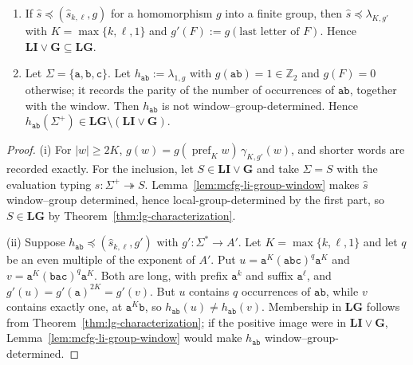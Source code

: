 \begin{proposition}
\label{prop:li-g-strict}
\begin{enumerate}[label=\textup{(\roman*)},leftmargin=*]
\item If $\widehat{s}\preceq(\widehat{s}_{k,\ell},g)$ for a homomorphism $g$ into a
finite group, then $\widehat{s}\preceq\lambda_{K,g'}$ with $K=\max\{k,\ell,1\}$
and $g'(F):=g(\text{last letter of }F)$.  Hence
$\mathbf{LI}\vee\mathbf G\subseteq\mathbf{LG}$.
\item Let $\Sigma=\{\mathtt a,\mathtt b,\mathtt c\}$.  Let
$h_{\mathtt{ab}}:=\lambda_{1,g}$ with $g(\mathtt{ab})=1\in\mathbb Z_2$
and $g(F)=0$ otherwise; it records the parity of the number of
occurrences of $\mathtt{ab}$, together with the window.  Then
$h_{\mathtt{ab}}$ is not window--group-determined.  Hence
$h_{\mathtt{ab}}(\Sigma^+)\in\mathbf{LG}\setminus(\mathbf{LI}\vee\mathbf G)$.
\end{enumerate}
\end{proposition}

\begin{proof}
(i) For $|w|\ge2K$,
$g(w)=g(\operatorname{pref}_Kw)\,\gamma_{K,g'}(w)$, and shorter words are
recorded exactly.  For the inclusion, let $S\in\mathbf{LI}\vee\mathbf G$ and
take $\Sigma=S$ with the evaluation typing $s:\Sigma^+\twoheadrightarrow S$.
Lemma~\ref{lem:mcfg-li-group-window} makes $\widehat{s}$ window--group
determined, hence local-group-determined by the first part, so
$S\in\mathbf{LG}$ by Theorem~\ref{thm:lg-characterization}.

(ii) Suppose $h_{\mathtt{ab}}\preceq(\widehat{s}_{k,\ell},g')$ with
$g':\Sigma^*\to A'$.  Let $K=\max\{k,\ell,1\}$ and let $q$ be an even
multiple of the exponent of $A'$.  Put
$u=\mathtt a^K(\mathtt{abc})^q\mathtt a^K$ and
$v=\mathtt a^K(\mathtt{bac})^q\mathtt a^K$.  Both are long, with prefix
$\mathtt a^k$ and suffix $\mathtt a^\ell$, and
$g'(u)=g'(\mathtt a)^{2K}=g'(v)$.  But $u$ contains $q$ occurrences of
$\mathtt{ab}$, while $v$ contains exactly one, at
$\mathtt a^K\mathtt b$, so $h_{\mathtt{ab}}(u)\ne h_{\mathtt{ab}}(v)$.
Membership in $\mathbf{LG}$ follows from
Theorem~\ref{thm:lg-characterization}; if the positive image were in
$\mathbf{LI}\vee\mathbf G$, Lemma~\ref{lem:mcfg-li-group-window} would make
$h_{\mathtt{ab}}$ window--group-determined.
\end{proof}

